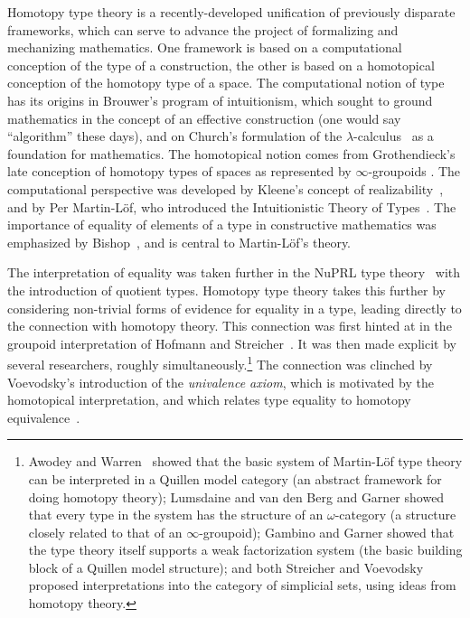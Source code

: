 \documentclass[11pt]{article}
\theoremstyle{remark}
\theoremstyle{definition}
\begin{document}
\noindent Homotopy type theory is a recently-developed unification of previously disparate frameworks, which can serve
to advance the project of formalizing and mechanizing mathematics.  One framework is based on a computational conception
of the type of a construction, the other is based on a homotopical conception of the homotopy type of a space.  
The computational notion of type has its origins in Brouwer's program of
intuitionism, which sought to ground mathematics in the concept of an effective
construction (one would say ``algorithm'' these days), and on Church's
formulation of the $\lambda$-calculus~\cite{church:lambda} as a foundation for
mathematics. The homotopical notion comes from Grothendieck's late conception of
homotopy types of spaces as represented by $\infty$-groupoids \cite{GrothPS}.
The computational perspective was developed by Kleene's concept of
realizability~\cite{kleene:im}, and by Per Martin-L\"{o}f, who introduced the
Intuitionistic Theory of Types~\cite{mltt}.  The importance of equality of
elements of a type in constructive mathematics was emphasized by
Bishop~\cite{bishop:ca}, and is central to Martin-L\"{o}f's theory.

The interpretation of equality was taken further in the NuPRL type
theory~\cite{NuPRL} with the introduction of quotient types.  Homotopy type
theory takes this further by considering non-trivial forms of evidence for
equality in a type, leading directly to the connection with homotopy theory.
This connection was first hinted at in the groupoid interpretation of Hofmann
and Streicher~\cite{HS,HofmannM:gromtt}.  It was then made explicit by several
researchers, roughly simultaneously.\footnote{%
  Awodey and Warren~\cite{AW} showed that the basic system of Martin-L\"{o}f
  type theory can be interpreted in a Quillen model category (an abstract
  framework for doing homotopy theory); Lumsdaine \cite{L} and van den Berg and
  Garner \cite{vandenBergB:typwg} showed that every type in the system has the
  structure of an $\omega$-category (a structure closely related to that of an
  $\infty$-groupoid); Gambino and Garner \cite{GG} showed that the type theory
  itself supports a weak factorization system (the basic building block of a
  Quillen model structure); and both Streicher \cite{StreicherNote} and
  Voevodsky \cite{VVnote} proposed interpretations into the category of
  simplicial sets, using ideas from homotopy theory.}  The connection was
clinched by Voevodsky's introduction of the \emph{univalence axiom}, which is
motivated by the homotopical interpretation, and which relates type equality to
homotopy equivalence~\cite{KLV,APW}.
\end{document}
